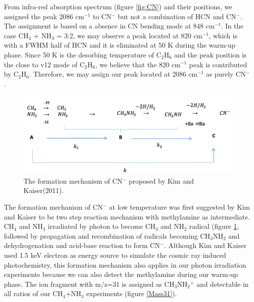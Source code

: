 From infra-red absorption spectrum (figure \ref{fig:CN}) and their positions, we assigned the peak 2086 cm$^{-1}$ to CN$^-$  but not a combination of HCN and CN$^-$. The assignment is based on a absence in CN bending mode at 848 cm$^{-1}$. In the case CH$_4$ + NH$_3$ = 3:2, we may observe a peak located at 820 cm$^{-1}$, which is with a FWHM half of HCN and it is eliminated at 50 K during the warm-up phase. Since 50 K is the desorbing temperature of C$_2$H$_6$ and the peak position is the close to v12 mode of C$_2$H$_6$, we believe that the 820 cm$^{-1}$ peak is contributed by C$_2$H$_6$. Therefore, we may assign our peak located at 2086 cm$^{-1}$ as purely CN$^-$.\\

\begin{figure}
\centering
\includegraphics[width=\textwidth]{figures/chapter3/CNmechanism}
\caption{The formation mechanism of CN$^-$ proposed by Kim and Kaiser(2011). }
\label{fig:CNmechanism}
\end{figure}

The formation mechanism of CN$^-$ at low temperature was first suggested by Kim and Kaiser \cite{kim} to be two step reaction mechanism with methylamine as intermediate. CH$_4$ and NH$_3$ irradiated by photon to become CH$_3$ and NH$_2$ radical (figure \ref{fig:CNmechanism}, followed by propagation and recombination of radicals becoming CH$_3$NH$_2$ and dehydrogenation and acid-base reaction to form CN$^-$.
Although Kim and Kaiser \cite{kim} used 1.5 keV electron as energy source to simulate the cosmic ray induced photochemistry, this formation mechanism also applies in our photon irradiation experiments because we can also detect the methylamine during our warm-up phase. The ion fragment with m/z=31 is assigned as CH$_3$NH$_2$$^+$ and detectable in all ratios of our CH$_4$+NH$_3$ experiments (figure \ref{Mass31}).

